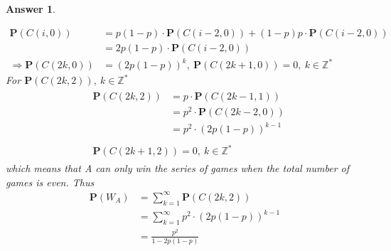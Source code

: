 \documentclass[utf8]{article}
\theoremstyle{definition}%
\theoremstyle{plain}%
\newtheorem{answer}{Answer} %
\begin{document}
\begin{answer}
\begin{enumerate}[label=(\alph*)]
        \begin{equation}
        \begin{aligned}
            \mathbf{P}(C(i,0)) &= p(1-p) \cdot \mathbf{P}(C(i-2,0)) + (1-p)p \cdot \mathbf{P}(C(i-2,0)) \\ 
            &= 2p(1-p) \cdot \mathbf{P}(C(i-2,0)) \\
            \Rightarrow \mathbf{P}(C(2k,0)) &= (2p(1-p))^k,~ \mathbf{P}(C(2k+1,0)) = 0,~ k\in\mathbb{Z^*}
        \end{aligned}
        \end{equation}
        For $\mathbf{P}(C(2k,2)),~k\in\mathbb{Z^*}$
        \begin{equation}
        \begin{aligned}
        &\begin{aligned}
            \mathbf{P}(C(2k,2)) &= p \cdot \mathbf{P}(C(2k-1,1)) \\
            &= p^2 \cdot \mathbf{P}(C(2k-2,0)) \\
            &= p^2 \cdot (2p(1-p))^{k-1}
        \end{aligned} \\
        &\begin{aligned}
            \mathbf{P}(C(2k+1,2)) = 0,~ k\in\mathbb{Z^*}
        \end{aligned}
        \end{aligned}
        \end{equation}
        which means that A can only win the series of games when the total number of games is even. Thus
        \begin{equation}
        \begin{aligned}
            \mathbf{P}(W_A) &= \sum_{k=1}^{\infty} \mathbf{P}(C(2k,2)) \\
            &= \sum_{k=1}^{\infty} p^2 \cdot (2p(1-p))^{k-1} \\
            &= \frac{p^2}{1-2p(1-p)}
        \end{aligned}
        \end{equation}
    \end{enumerate}
\end{answer}
\end{document}
